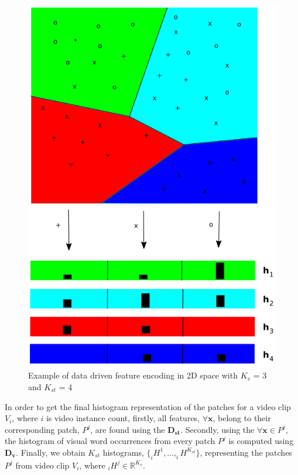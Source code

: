 \begin{figure}[htbp]
\begin{center}
\includegraphics[scale=0.5]{Figures/featureEncoding}
\end{center}
\caption{Example of data driven feature encoding in 2D space with $K_{v}$ = 3 and $K_{st}$ = 4\label{fig:featureEncoding}}
\end{figure}
    
	In order to get the final histogram representation of the patches for a video clip $V_{i}$, where $i$ is video instance count, firstly, all features, $\forall \mathbf{x}$, belong to their corresponding patch, $P^{j}$, are found using the $\mathbf{D_{st}}$. Secondly, using the $\forall \mathbf{x} \in P^{j}$, the histogram of visual word occurrences from every patch $P^{j}$ is computed using $\mathbf{D_{v}}$. Finally, we obtain $K_{st}$ histograms, $\{_{i}H^{1},..., _{i}H^{K_{st}}\}$, representing the patches $P^{j}$ from video clip $V_{i}$, where $_{i}H^{j} \in \mathbb{R}^{K_{v}}$.
